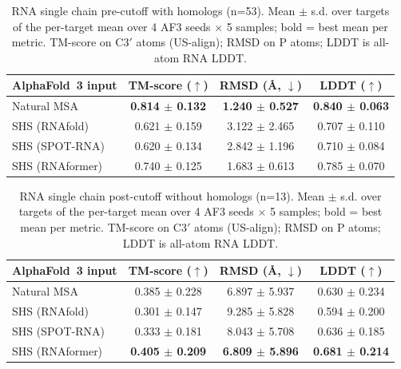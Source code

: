 \begin{table}[htbp]
\centering
\caption{RNA single chain pre-cutoff with homologs (n=53). Mean $\pm$ s.d. over targets of the per-target mean over 4 AF3 seeds $\times$ 5 samples; bold = best mean per metric. TM-score on C3$'$ atoms (US-align); RMSD on P atoms; LDDT is all-atom RNA LDDT.}
\label{tab:rna_single_chain_pre_cutoff_with_homologs}
\begin{tabular}{lccc}
\toprule
AlphaFold~3 input & TM-score ($\uparrow$) & RMSD (\AA, $\downarrow$) & LDDT ($\uparrow$) \\
\midrule
Natural MSA & \textbf{0.814 $\pm$ 0.132} & \textbf{1.240 $\pm$ 0.527} & \textbf{0.840 $\pm$ 0.063} \\
SHS (RNAfold) & 0.621 $\pm$ 0.159 & 3.122 $\pm$ 2.465 & 0.707 $\pm$ 0.110 \\
SHS (SPOT-RNA) & 0.620 $\pm$ 0.134 & 2.842 $\pm$ 1.196 & 0.710 $\pm$ 0.084 \\
SHS (RNAformer) & 0.740 $\pm$ 0.125 & 1.683 $\pm$ 0.613 & 0.785 $\pm$ 0.070 \\
\bottomrule
\end{tabular}
\end{table}

\begin{table}[htbp]
\centering
\caption{RNA single chain post-cutoff without homologs (n=13). Mean $\pm$ s.d. over targets of the per-target mean over 4 AF3 seeds $\times$ 5 samples; bold = best mean per metric. TM-score on C3$'$ atoms (US-align); RMSD on P atoms; LDDT is all-atom RNA LDDT.}
\label{tab:rna_single_chain_post_cutoff_without_homologs}
\begin{tabular}{lccc}
\toprule
AlphaFold~3 input & TM-score ($\uparrow$) & RMSD (\AA, $\downarrow$) & LDDT ($\uparrow$) \\
\midrule
Natural MSA & 0.385 $\pm$ 0.228 & 6.897 $\pm$ 5.937 & 0.630 $\pm$ 0.234 \\
SHS (RNAfold) & 0.301 $\pm$ 0.147 & 9.285 $\pm$ 5.828 & 0.594 $\pm$ 0.200 \\
SHS (SPOT-RNA) & 0.333 $\pm$ 0.181 & 8.043 $\pm$ 5.708 & 0.636 $\pm$ 0.185 \\
SHS (RNAformer) & \textbf{0.405 $\pm$ 0.209} & \textbf{6.809 $\pm$ 5.896} & \textbf{0.681 $\pm$ 0.214} \\
\bottomrule
\end{tabular}
\end{table}

